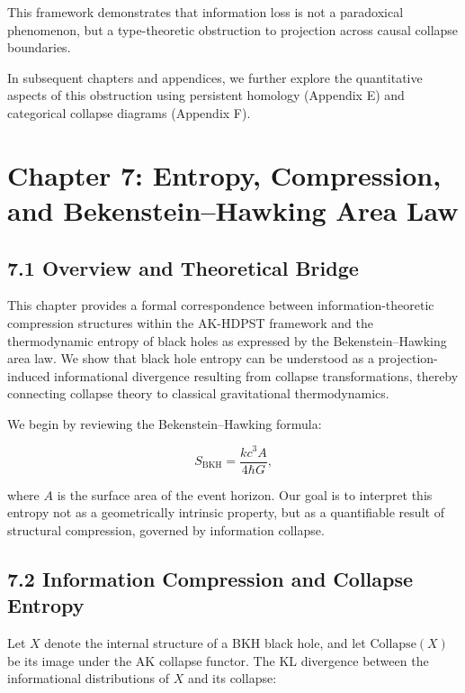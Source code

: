 \documentclass[11pt]{article}
\begin{document}
This framework demonstrates that information loss is not a paradoxical phenomenon, but a type-theoretic obstruction to projection across causal collapse boundaries.

In subsequent chapters and appendices, we further explore the quantitative aspects of this obstruction using persistent homology (Appendix E) and categorical collapse diagrams (Appendix F).



\section{Chapter 7: Entropy, Compression, and Bekenstein–Hawking Area Law}

\subsection*{7.1 Overview and Theoretical Bridge}

This chapter provides a formal correspondence between information-theoretic compression structures within the AK-HDPST framework and the thermodynamic entropy of black holes as expressed by the Bekenstein–Hawking area law. We show that black hole entropy can be understood as a projection-induced informational divergence resulting from collapse transformations, thereby connecting collapse theory to classical gravitational thermodynamics.

We begin by reviewing the Bekenstein–Hawking formula:

\[
S_{\mathrm{BKH}} = \frac{k c^3 A}{4 \hbar G},
\]

where \( A \) is the surface area of the event horizon. Our goal is to interpret this entropy not as a geometrically intrinsic property, but as a quantifiable result of structural compression, governed by information collapse.

\subsection*{7.2 Information Compression and Collapse Entropy}

Let \( X \) denote the internal structure of a BKH black hole, and let \( \mathrm{Collapse}(X) \) be its image under the AK collapse functor. The KL divergence between the informational distributions of \( X \) and its collapse:
\end{document}
